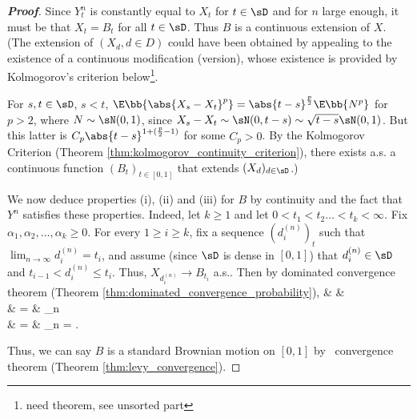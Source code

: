 \begin{proof}[\bf Proof]
Since $Y^n_t$ is constantly equal to $X_t$ for $t \in \sD$ and for $n$ large enough, it must be that $X_t = B_t$ for all $t \in \sD$. Thus $B$ is a continuous extension of $X$. (The extension of $(X_d, d \in D)$ could have been obtained by appealing to the existence of a continuous modification (version), whose existence is provided by Kolmogorov's criterion below\footnote{need theorem, see unsorted part}.%

For $s, t \in \sD$, $s < t$, $\E\bb{\abs{X_s-X_t }^p} = \abs{t-s}^{\frac p2} \E\bb{N^p}$ for $p > 2$, where $N \sim \sN (0, 1)$, since $X_s - X_t \sim \sN (0, t -s) \sim \sqrt{t -s}\sN (0, 1)$. But this latter is $C_p\abs{t -s}^{1+(\frac p2 -1)}$ for some $C_p > 0$. By the Kolmogorov Criterion (Theorem \ref{thm:kolmogorov_continuity_criterion}), there exists a.s. a continuous function $(B_t)_{t\in [0,1]}$ that extends $(X_d)_{d\in \sD}$.) %


We now deduce properties (i), (ii) and (iii) for $B$ by continuity and the fact that $Y^n$ satisfies these properties. Indeed, let $k \geq 1$ and let $0 < t_1 < t_2 \dots < t_k < \infty$. Fix $\alpha_1, \alpha_2,\dots, \alpha_k \geq 0$. For every $1 \geq i \geq k$, fix a sequence $(d^{(n)}_i)_t$ such that $\lim_{n\to \infty} d^{(n)}_i = t_i$, and assume (since $\sD$ is dense in $[0, 1]$) that $d^{(n)}_i\in \sD$ and $t_{i-1} < d^{(n)}_i \leq t_i$. Thus, $X_{d^{(n)}_i} \to B_{t_i}$ a.s.. Then by dominated convergence theorem (Theorem \ref{thm:dominated_convergence_probability}),
\beast
& & \E{}\\
& = & \lim_{n\to \infty} \E{}\\
& = & \lim_{n\to \infty} \exp{} = \exp{}.
\eeast

Thus, we can say $B$ is a standard Brownian motion on $[0,1]$ by \levy\ convergence theorem (Theorem \ref{thm:levy_convergence}).


\end{proof}
